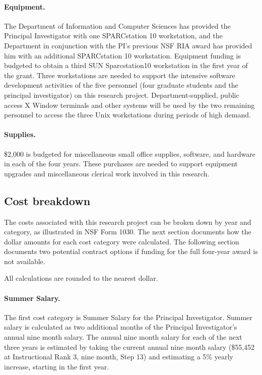 \paragraph{Equipment.}  
The Department of Information and Computer Sciences has provided the
Principal Investigator with one SPARCstation 10 workstation, and the
Department in conjunction with the PI's previous NSF RIA award has provided
him with an additional SPARCstation 10 workstation.  Equipment funding is
budgeted to obtain a third SUN Sparcstation10 workstation in the first year
of the grant.  Three workstations are needed to support the intensive
software development activities of the five personnel (four graduate
students and the principal investigator) on this research project.
Department-supplied, public access X Window terminals and other systems
will be used by the two remaining personnel to access the three Unix
workstations during periods of high demand.

\paragraph{Supplies.}
\$2,000 is budgeted for miscellaneous small office supplies, software, and
hardware in each of the four years.  These purchases are needed to 
support equipment upgrades and miscellaneous clerical work involved in 
this research.

\subsection{Cost breakdown}
\label{cost-breakdown}

The costs associated with this research project can be broken down by year
and category, as illustrated in NSF Form 1030.  The next section documents
how the dollar amounts for each cost category were calculated.  The
following section documents two potential contract options if funding for
the full four-year award is not available.

All calculations are rounded to the nearest dollar.

\paragraph{Summer Salary.}  
The first cost category is Summer Salary for the Principal Investigator.
Summer salary is calculated as two additional months of the Principal
Investigator's annual nine month salary.  The annual nine month salary for
each of the next three years is estimated by taking the current annual nine
month salary (\$55,452 at Instructional Rank 3, nine month, Step 13) and
estimating a 5\% yearly increase, starting in the first year.

